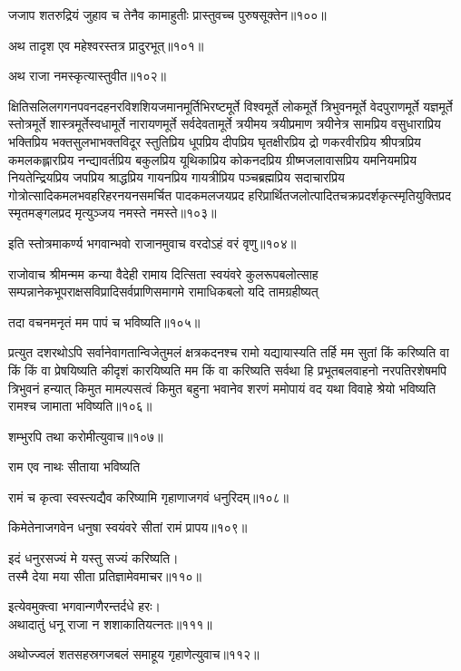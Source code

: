 \begin{flushleft}
जजाप शतरुद्रियं जुहाव च तेनैव कामाहुतीः प्रास्तुवच्च पुरुषसूक्तेन॥१००॥

अथ तादृश एव महेश्वरस्तत्र प्रादुरभूत्॥१०१॥

अथ राजा नमस्कृत्यास्तुवीत॥१०२॥


क्षितिसलिलगगनपवनदहनरविशशियजमानमूर्तिभिरष्टमूर्ते विश्वमूर्ते लोकमूर्ते त्रिभुवनमूर्ते वेदपुराणमूर्ते यज्ञमूर्ते स्तोत्रमूर्ते शास्त्रमूर्तेस्वधामूर्ते नारायणमूर्ते सर्वदेवतामूर्ते त्रयीमय त्रयीप्रमाण त्रयीनेत्र सामप्रिय वसुधाराप्रिय भक्तिप्रिय भक्तसुलभाभक्तविदूर स्तुतिप्रिय धूपप्रिय दीपप्रिय घृतक्षीरप्रिय द्रो णकरवीरप्रिय श्रीपत्रप्रिय कमलकह्लारप्रिय नन्द्यावर्तप्रिय बकुलप्रिय यूथिकाप्रिय कोकनदप्रिय ग्रीष्मजलावासप्रिय यमनियमप्रिय नियतेन्द्रियप्रिय जपप्रिय श्राद्धप्रिय गायनप्रिय गायत्रीप्रिय पञ्चब्रह्मप्रिय सदाचारप्रिय गोत्रोत्सादिकमलभवहरिहरनयनसमर्चित पादकमलजयप्रद हरिप्रार्थितजलोत्पादितचक्रप्रदर्शकृत्स्मृतियुक्तिप्रद स्मृतमङ्गलप्रद मृत्युञ्जय नमस्ते नमस्ते॥१०३॥

इति स्तोत्रमाकर्ण्य भगवान्भवो राजानमुवाच वरदोऽहं वरं वृणु॥१०४॥

राजोवाच श्रीमन्मम कन्या वैदेही रामाय दित्सिता स्वयंवरे कुलरूपबलोत्साह सम्पन्नानेकभूपराक्षसविप्रादिसर्वप्राणिसमागमे रामाधिकबलो यदि तामग्रहीष्यत्

तदा वचनमनृतं मम पापं च भविष्यति॥१०५॥

प्रत्युत दशरथोऽपि सर्वानेवागतान्विजेतुमलं क्षत्रकदनश्च रामो यद्यायास्यति तर्हि मम सुतां किं करिष्यति वा किं किं वा प्रेषयिष्यति कीदृशं कारयिष्यति मम किं वा करिष्यति सर्वथा हि प्रभूतबलवाहनो नरपतिरशेषमपि त्रिभुवनं हन्यात् किमुत मामल्पसत्वं किमुत बहुना भवानेव शरणं ममोपायं वद यथा विवाहे श्रेयो भविष्यति रामश्च जामाता भविष्यति॥१०६॥

शम्भुरपि तथा करोमीत्युवाच॥१०७॥

राम एव नाथः सीताया भविष्यति

रामं च कृत्वा स्वस्त्यद्यैव करिष्यामि गृहाणाजगवं धनुरिदम्॥१०८॥


किमेतेनाजगवेन धनुषा स्वयंवरे सीतां रामं प्रापय॥१०९॥


इदं धनुरसज्यं मे यस्तु सज्यं करिष्यति।\\
तस्मै देया मया सीता प्रतिज्ञामेवमाचर॥११०॥

इत्येवमुक्त्वा भगवान्गणैरन्तर्दधे हरः।\\
अथादातुं धनू राजा न शशाकातियत्नतः॥१११॥

अथोज्ज्वलं शतसहस्रगजबलं समाहूय गृहाणेत्युवाच॥११२॥


\end{flushleft}
